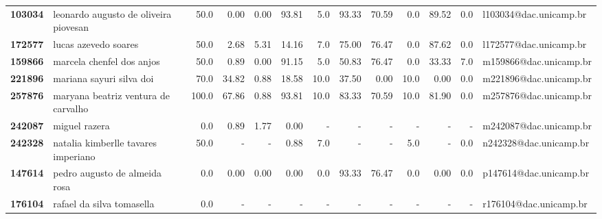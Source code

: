 \documentclass[11pt]{article}
\begin{document}
\begin{longtable}{llrrrrrrrrrrl}
\textbf{103034} &  leonardo augusto de oliveira piovesan &                  50.0 &        0.00 &        0.00 &       93.81 &                      5.0 &       93.33 &       70.59 &                        0.0 &       89.52 &                      0.0 &  l103034@dac.unicamp.br \\
\textbf{172577} &                   lucas azevedo soares &                  50.0 &        2.68 &        5.31 &       14.16 &                      7.0 &       75.00 &       76.47 &                        0.0 &       87.62 &                      0.0 &  l172577@dac.unicamp.br \\
\textbf{159866} &              marcela chenfel dos anjos &                  50.0 &        0.89 &        0.00 &       91.15 &                      5.0 &       50.83 &       76.47 &                        0.0 &       33.33 &                      7.0 &  m159866@dac.unicamp.br \\
\textbf{221896} &               mariana sayuri silva doi &                  70.0 &       34.82 &        0.88 &       18.58 &                     10.0 &       37.50 &        0.00 &                       10.0 &        0.00 &                      0.0 &  m221896@dac.unicamp.br \\
\textbf{257876} &    maryana beatriz ventura de carvalho &                 100.0 &       67.86 &        0.88 &       93.81 &                     10.0 &       83.33 &       70.59 &                       10.0 &       81.90 &                      0.0 &  m257876@dac.unicamp.br \\
\textbf{242087} &                          miguel razera &                   0.0 &        0.89 &        1.77 &        0.00 &                        - &           - &           - &                          - &           - &                        - &  m242087@dac.unicamp.br \\
\textbf{242328} &    natalia kimberlle tavares imperiano &                  50.0 &           - &           - &        0.88 &                      7.0 &           - &           - &                        5.0 &           - &                      0.0 &  n242328@dac.unicamp.br \\
\textbf{147614} &          pedro augusto de almeida rosa &                   0.0 &        0.00 &        0.00 &        0.00 &                      0.0 &       93.33 &       76.47 &                        0.0 &        0.00 &                      0.0 &  p147614@dac.unicamp.br \\
\textbf{176104} &              rafael da silva tomasella &                   0.0 &           - &           - &           - &                        - &           - &           - &                          - &           - &                        - &  r176104@dac.unicamp.br \\

\end{longtable}
\end{document}
